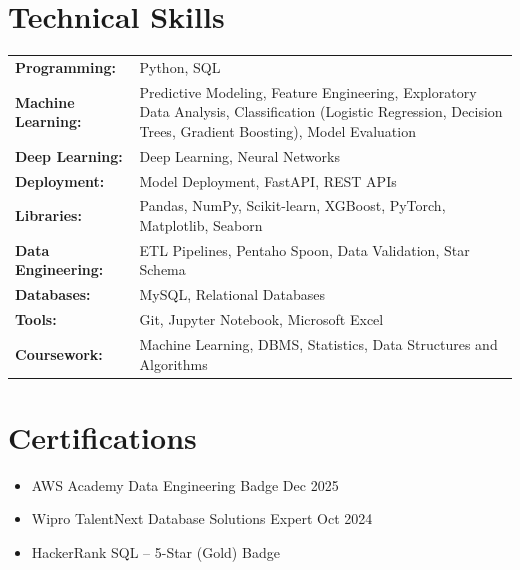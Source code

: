 \documentclass[a4paper,12pt]{article}
\begin{document}
\section{Technical Skills}
\begin{tabularx}{\linewidth}{@{}l X@{}}
\textbf{Programming:} & \normalsize{Python, SQL}\\
\textbf{Machine Learning:} & \normalsize{Predictive Modeling, Feature Engineering, Exploratory Data Analysis, Classification (Logistic Regression, Decision Trees, Gradient Boosting), Model Evaluation}\\
\textbf{Deep Learning:} & \normalsize{Deep Learning, Neural Networks}\\
\textbf{Deployment:} & \normalsize{Model Deployment, FastAPI, REST APIs}\\
\textbf{Libraries:} & \normalsize{Pandas, NumPy, Scikit-learn, XGBoost, PyTorch, Matplotlib, Seaborn}\\
\textbf{Data Engineering:} & \normalsize{ETL Pipelines, Pentaho Spoon, Data Validation, Star Schema}\\
\textbf{Databases:} & \normalsize{MySQL, Relational Databases}\\
\textbf{Tools:} & \normalsize{Git, Jupyter Notebook, Microsoft Excel}\\
\textbf{Coursework:} & \normalsize{Machine Learning, DBMS, Statistics, Data Structures and Algorithms}\\

\end{tabularx}


\section{Certifications}

\begin{itemize}[leftmargin=1em, itemsep=10pt, label=--]
    \item AWS Academy Data Engineering Badge \hfill Dec 2025
    \item Wipro TalentNext Database Solutions Expert \hfill Oct 2024
    \item HackerRank SQL -- 5-Star (Gold) Badge
\end{itemize}


\vfill
\center
\end{document}
